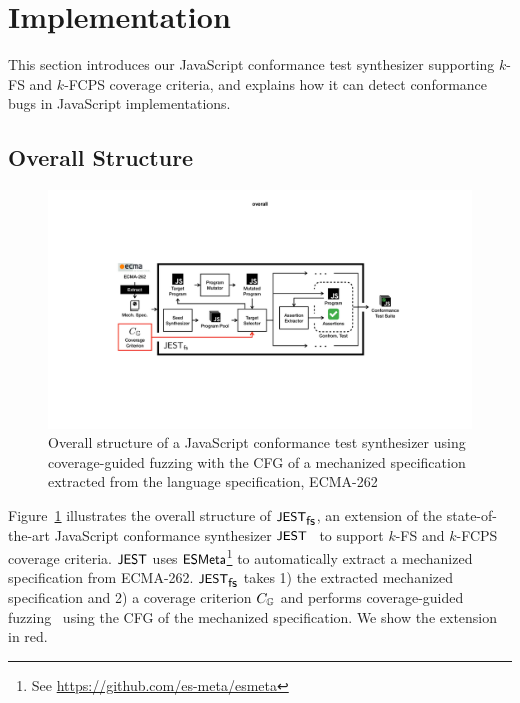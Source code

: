 \section{Implementation}\label{sec:impl}

This section introduces our JavaScript
conformance test synthesizer supporting $k$-FS and $k$-FCPS coverage criteria,
and explains how it can detect conformance bugs in JavaScript implementations.


\subsection{Overall Structure}\label{sec:overall}

\begin{figure}
  \includegraphics[width=\textwidth]{img/overall}
  \caption{
    Overall structure of a JavaScript conformance test synthesizer using
    coverage-guided fuzzing with the CFG of a mechanized specification
    extracted from the language specification, ECMA-262
  }
  \label{fig:overall}
\end{figure}

Figure~\ref{fig:overall} illustrates the overall structure of $\textsf{\small JEST}_{\textsf{\small fs}}$,
an extension of the state-of-the-art JavaScript conformance synthesizer $\textsf{\small JEST}$~\cite{jiset}
to support $k$-FS and $k$-FCPS coverage criteria.
$\textsf{\small JEST}$ uses $\textsf{\small ESMeta}$\footnote{
  See \url{https://github.com/es-meta/esmeta}
} to automatically extract a mechanized specification from ECMA-262.
$\textsf{\small JEST}_{\textsf{\small fs}}$ takes 1) the extracted mechanized specification
and 2) a coverage criterion $C_{\mathbb{G}}$ and performs
coverage-guided fuzzing~\cite{afl} using the CFG of the mechanized specification.
We show the extension in red.


